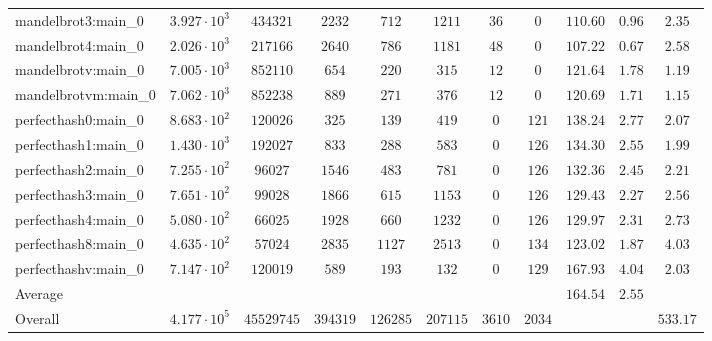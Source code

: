 \begin{tabular}{|l|c|c|c|c|c|c|c|c|c|c|}
mandelbrot3:main\_0            & $ 3.927 \cdot 10^{3} $ & $ 434321   $ & $ 2232   $ & $ 712    $ & $ 1211   $ & $ 36   $ & $ 0    $ & $ 110.60      $ & $ 0.96    $ & $ 2.35    $ \\
mandelbrot4:main\_0            & $ 2.026 \cdot 10^{3} $ & $ 217166   $ & $ 2640   $ & $ 786    $ & $ 1181   $ & $ 48   $ & $ 0    $ & $ 107.22      $ & $ 0.67    $ & $ 2.58    $ \\
mandelbrotv:main\_0            & $ 7.005 \cdot 10^{3} $ & $ 852110   $ & $ 654    $ & $ 220    $ & $ 315    $ & $ 12   $ & $ 0    $ & $ 121.64      $ & $ 1.78    $ & $ 1.19    $ \\
mandelbrotvm:main\_0           & $ 7.062 \cdot 10^{3} $ & $ 852238   $ & $ 889    $ & $ 271    $ & $ 376    $ & $ 12   $ & $ 0    $ & $ 120.69      $ & $ 1.71    $ & $ 1.15    $ \\
perfecthash0:main\_0           & $ 8.683 \cdot 10^{2} $ & $ 120026   $ & $ 325    $ & $ 139    $ & $ 419    $ & $ 0    $ & $ 121  $ & $ 138.24      $ & $ 2.77    $ & $ 2.07    $ \\
perfecthash1:main\_0           & $ 1.430 \cdot 10^{3} $ & $ 192027   $ & $ 833    $ & $ 288    $ & $ 583    $ & $ 0    $ & $ 126  $ & $ 134.30      $ & $ 2.55    $ & $ 1.99    $ \\
perfecthash2:main\_0           & $ 7.255 \cdot 10^{2} $ & $ 96027    $ & $ 1546   $ & $ 483    $ & $ 781    $ & $ 0    $ & $ 126  $ & $ 132.36      $ & $ 2.45    $ & $ 2.21    $ \\
perfecthash3:main\_0           & $ 7.651 \cdot 10^{2} $ & $ 99028    $ & $ 1866   $ & $ 615    $ & $ 1153   $ & $ 0    $ & $ 126  $ & $ 129.43      $ & $ 2.27    $ & $ 2.56    $ \\
perfecthash4:main\_0           & $ 5.080 \cdot 10^{2} $ & $ 66025    $ & $ 1928   $ & $ 660    $ & $ 1232   $ & $ 0    $ & $ 126  $ & $ 129.97      $ & $ 2.31    $ & $ 2.73    $ \\
perfecthash8:main\_0           & $ 4.635 \cdot 10^{2} $ & $ 57024    $ & $ 2835   $ & $ 1127   $ & $ 2513   $ & $ 0    $ & $ 134  $ & $ 123.02      $ & $ 1.87    $ & $ 4.03    $ \\
perfecthashv:main\_0           & $ 7.147 \cdot 10^{2} $ & $ 120019   $ & $ 589    $ & $ 193    $ & $ 132    $ & $ 0    $ & $ 129  $ & $ 167.93      $ & $ 4.04    $ & $ 2.03    $ \\
\hline
Average                        & $                    $ & $          $ & $        $ & $        $ & $        $ & $      $ & $      $ & $ 164.54      $ & $ 2.55    $ & $         $ \\
\hline
Overall                        & $ 4.177 \cdot 10^{5} $ & $ 45529745 $ & $ 394319 $ & $ 126285 $ & $ 207115 $ & $ 3610 $ & $ 2034 $ & $             $ & $         $ & $ 533.17  $ \\
\hline
\end{tabular}
